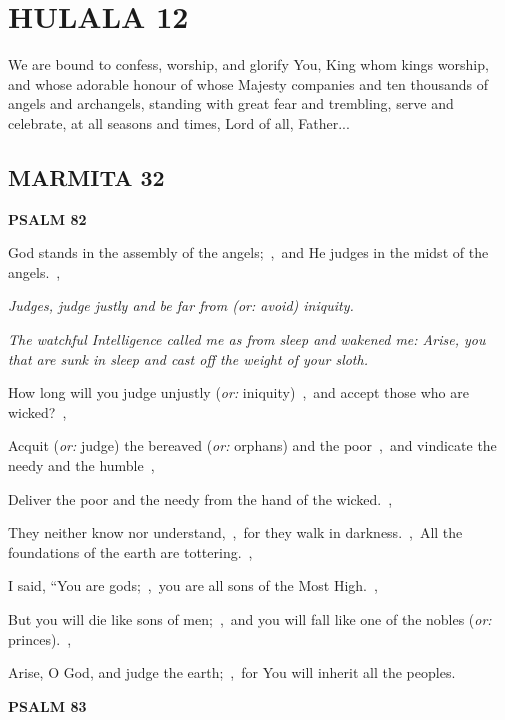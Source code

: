 \documentclass[12pt,twoside,a5paper]{article}
\newcommand{\hulala}[1]{\section*{HULALA {#1}}}
\newcommand{\marmita}[1]{\subsection*{MARMITA {#1}}}
\newcommand{\psalm}[1]{\textbf{PSALM {#1}}\nopagebreak}
\newcommand{\qanona}[1]{{\liturgicalhint{Qanona.} \emph{#1}}}
\newcommand{\slota}[1]{\liturgicalhint{Slota.} #1}
\newcommand{\translationoption}[1]{\emph{or:} #1}
\begin{document}

\hulala{12}

\slota{We are bound to confess, worship, and glorify You, King whom kings worship, and whose adorable honour of whose Majesty companies and ten thousands of angels and archangels, standing with great fear and trembling, serve and celebrate, at all seasons and times, Lord of all, Father...}

\marmita{32}

\psalm{82}

\begin{normalparskip}
  God stands in the assembly of the angels;~\sep\ and He judges in the midst of the angels.~\sep

  \qanona{Judges, judge justly and be far from (\translationoption{avoid}) iniquity.}

   \emph{The watchful Intelligence called me as from sleep and wakened me: Arise, you that are sunk in sleep and cast off the weight of your sloth.}

  How long will you judge unjustly (\translationoption{iniquity})~\sep\ and accept those who are wicked?~\sep

  Acquit (\translationoption{judge}) the bereaved (\translationoption{orphans}) and the poor~\sep\ and vindicate the needy and the humble~\sep

  Deliver the poor and the needy from the hand of the wicked.~\sep

  They neither know nor understand,~\sep\ for they walk in darkness.~\sep\ All the foundations of the earth are tottering.~\sep

  I said, ``You are gods;~\sep\ you are all sons of the Most High.~\sep

  But you will die like sons of men;~\sep\ and you will fall like one of the nobles (\translationoption{princes}).~\sep

  Arise, O God, and judge the earth;~\sep\ for You will inherit all the peoples.
\end{normalparskip}

\psalm{83}
\end{document}
